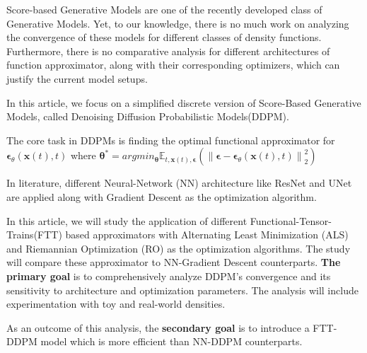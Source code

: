 \documentclass[11pt]{article}
\begin{document}
    Score-based Generative Models are one of the recently developed class of Generative Models.
    Yet, to our knowledge, there is no much work on analyzing the convergence of these models for different classes of density functions.
    Furthermore, there is no comparative analysis for different architectures of function approximator, along with their corresponding
    optimizers, which can justify the current model setups.

    In this article, we focus on a simplified discrete version of Score-Based Generative Models, called
    Denoising Diffusion Probabilistic Models(DDPM).

    The core task in DDPMs is finding the optimal functional approximator for $\bm{\epsilon}_{\theta}(\mathbf{x}(t),t)$
    where $\bm{\theta}^{*} = argmin_{\bm{\theta}}\mathbb{E}_{t,\mathbf{x}(t),\bm{\epsilon}}\left(  \left\lVert \bm{\epsilon}-\bm{\epsilon}_{\theta}(\mathbf{x}(t),t)\right\lVert_2^2\right)$


    In literature, different Neural-Network (NN) architecture like ResNet and UNet are applied along with Gradient
    Descent as the optimization algorithm.

    In this article, we will study the application of different Functional-Tensor-Trains(FTT) based approximators
    with Alternating Least Minimization (ALS) and Riemannian Optimization (RO) as the optimization algorithms.
    The study will compare these approximator to NN-Gradient Descent counterparts.
    \textbf{The primary goal} is to comprehensively analyze DDPM's convergence and its sensitivity to architecture and
    optimization parameters.
    The analysis will include experimentation with toy and real-world densities.

    As an outcome of this analysis, the \textbf{secondary goal} is to introduce a FTT-DDPM model which
    is more efficient than NN-DDPM counterparts.
\end{document}
